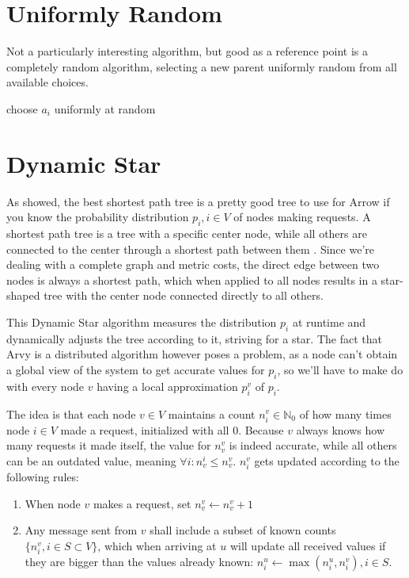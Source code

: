 \documentclass[a4paper, oneside]{discothesis}
\begin{document}
\section{Uniformly Random}

Not a particularly interesting algorithm, but good as a reference point is a completely random algorithm, selecting a new parent uniformly random from all available choices.

\begin{algorithmic}
\State\Return choose $a_i$ uniformly at random
\EndFunction
\end{algorithmic}

\section{Dynamic Star}

As \cite{Peleg} showed, the best shortest path tree is a pretty good tree to use for Arrow if you know the probability distribution $p_i, i\in V$ of nodes making requests. A shortest path tree is a tree with a specific center node, while all others are connected to the center through a shortest path between them . Since we're dealing with a complete graph and metric costs, the direct edge between two nodes is always a shortest path, which when applied to all nodes results in a star-shaped tree with the center node connected directly to all others.

This Dynamic Star algorithm measures the distribution $p_i$ at runtime and dynamically adjusts the tree according to it, striving for a star. The fact that Arvy is a distributed algorithm however poses a problem, as a node can't obtain a global view of the system to get accurate values for $p_i$, so we'll have to make do with every node $v$ having a local approximation $p_i^v$ of $p_i$.

The idea is that each node $v\in V$ maintains a count $n_i^v\in\mathbb{N}_0$ of how many times node $i\in V$ made a request, initialized with all $0$. Because $v$ always knows how many requests it made itself, the value for $n_v^v$ is indeed accurate, while all others can be an outdated value, meaning $\forall i:n_v^i\leq n_v^v$. $n_i^v$ gets updated according to the following rules:
\begin{enumerate}
\item When node $v$ makes a request, set $n_v^v\gets n_v^v+1$
\item Any message sent from $v$ shall include a subset of known counts $\{n_i^v,i\in S\subset V\}$, which when arriving at $u$ will update all received values if they are bigger than the values already known: $n_i^u\gets \max(n_i^u,n_i^v),i\in S$.
\end{enumerate}
\end{document}
